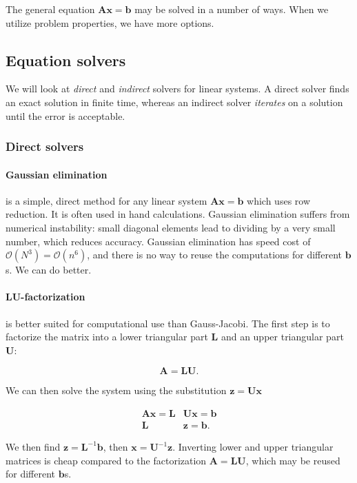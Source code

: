 The general equation $\mathbf{A} \mathbf{x} = \mathbf{b}$ may be solved in a number of ways. When we utilize problem properties, we have more options.

\subsection{Equation solvers}
We will look at \emph{direct} and \emph{indirect} solvers for linear systems. A direct solver finds an exact solution in finite time, whereas an indirect solver \emph{iterates} on a solution until the error is acceptable.

\subsubsection{Direct solvers}
\paragraph*{Gaussian elimination} is a simple, direct method for any linear system $\mathbf{A}\mathbf{x} = \mathbf{b}$ which uses row reduction. It is often used in hand calculations. Gaussian elimination suffers from numerical instability: small diagonal elements lead to dividing by a very small number, which reduces accuracy. Gaussian elimination has speed cost of $\mathcal{O}(N^3) = \mathcal{O}(n^6)$, and there is no way to reuse the computations for different $\mathbf{b}$s. We can do better.

\paragraph*{LU-factorization} is better suited for computational use than Gauss-Jacobi. The first step is to factorize the matrix into a lower triangular part $\mathbf{L}$ and an upper triangular part $\mathbf{U}$:

\begin{equation}
  \mathbf{A} = \mathbf{L} \mathbf{U}.
\end{equation}

We can then solve the system using the substitution $\mathbf{z} = \mathbf{U} \mathbf{x}$

\begin{align}
  \mathbf{A} \mathbf{x} = \mathbf{L} &\mathbf{U} \mathbf{x} = \mathbf{b} \\
  \mathbf{L} &\mathbf{z} = \mathbf{b}.
\end{align}

We then find $\mathbf{z} = \mathbf{L}^{-1} \mathbf{b}$, then $\mathbf{x} = \mathbf{U}^{-1} \mathbf{z}$. Inverting lower and upper triangular matrices is cheap compared to the factorization $\mathbf{A} = \mathbf{L} \mathbf{U}$, which may be reused for different $\mathbf{b}$s.

